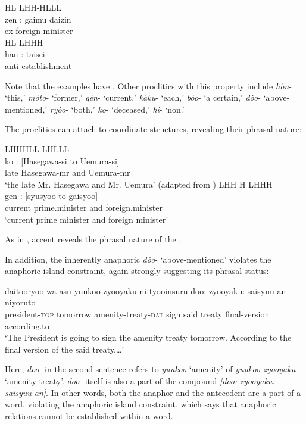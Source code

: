 \documentclass[output=paper]{LSP/langsci}
\begin{document}
\ea\label{ex:nishiyama:35}
 \ea 
\glll HL {} LHH-HLLL   \\
zen : {gaimu daizin} \\
ex {} {foreign minister}\\
\ex  
\glll HL {} LHHH \\
han : taisei\\
anti {} establishment\\
\z \z

Note that the examples have . Other proclitics with this property include \textit{hòn}{}- ‘this,’ \textit{mòto}{}- ‘former,’ \textit{gèn}{}- ‘current,’ \textit{kàku}{}- ‘each,’ \textit{bòo}{}- ‘a certain,’ \textit{dòo}{}- ‘above-mentioned,’ \textit{ryòo}{}- ‘both,’ \textit{ko}{}- ‘deceased,’ \textit{hi}{}- ‘non.’

The proclitics can attach to coordinate structures, revealing their phrasal nature:

\ea\label{ex:nishiyama:36}
 \ea 
\gll {} {} LHHHLL {} LHLLL\\
ko : [Hasegawa-si to Uemura-si]      \\
late {} Hasegawa-mr and Uemura-mr \\
\glt `the late Mr. Hasegawa and Mr. Uemura'  (adapted from \citealt[265]{Kageyama2001})
\ex  
\glll {} {} LHH  H  LHHH\\
gen : [syusyoo to gaisyoo]\\
current {} prime.minister and foreign.minister\\ 
\glt ‘current prime minister and foreign minister’
\z \z

As in , accent reveals the phrasal nature of the .

In addition, the inherently anaphoric  \textit{dòo}{}- ‘above-mentioned’ violates the anaphoric island constraint, again strongly suggesting its phrasal status:

\ea\label{ex:nishiyama:37}
 \gll daitooryoo-wa asu     yuukoo-zyooyaku-ni tyooinsuru     doo: zyooyaku: saisyuu-an niyoruto\\
  president-\textsc{top}  tomorrow amenity-treaty-\textsc{dat}  sign       said treaty    final-version according.to\\ 
\glt ‘The President is going to sign the amenity treaty tomorrow. According to the final version of the said treaty,…’            \citep[258]{Kageyama2001}
\z

Here, \textit{doo}{}- in the second sentence refers to \textit{yuukoo} ‘amenity’ of \textit{yuukoo-zyoo\-yaku} ‘amenity treaty’. \textit{doo}{}- itself is also a part of the compound \textit{[doo: zyooyaku: saisyuu-an]}. In other words, both the anaphor and the antecedent are a part of a word, violating the anaphoric island constraint, which says that anaphoric relations cannot be established within a word.
\end{document}
